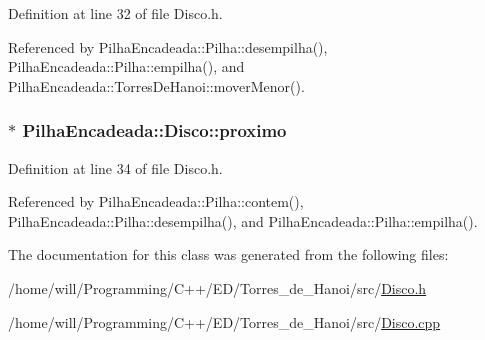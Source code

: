 Definition at line 32 of file Disco.h.



Referenced by PilhaEncadeada::Pilha::desempilha(), PilhaEncadeada::Pilha::empilha(), and PilhaEncadeada::TorresDeHanoi::moverMenor().

\hypertarget{classPilhaEncadeada_1_1Disco_af118ba39cf542407c27d9f23ece776ef}{
\subsubsection[{proximo}]{$\ast$ {\bf PilhaEncadeada::Disco::proximo}}}
\label{classPilhaEncadeada_1_1Disco_af118ba39cf542407c27d9f23ece776ef}


Definition at line 34 of file Disco.h.



Referenced by PilhaEncadeada::Pilha::contem(), PilhaEncadeada::Pilha::desempilha(), and PilhaEncadeada::Pilha::empilha().



The documentation for this class was generated from the following files:\begin{DoxyCompactItemize}
\item 
/home/will/Programming/C++/ED/Torres\_\-de\_\-Hanoi/src/\hyperlink{Disco_8h}{Disco.h}\item 
/home/will/Programming/C++/ED/Torres\_\-de\_\-Hanoi/src/\hyperlink{Disco_8cpp}{Disco.cpp}\end{DoxyCompactItemize}

